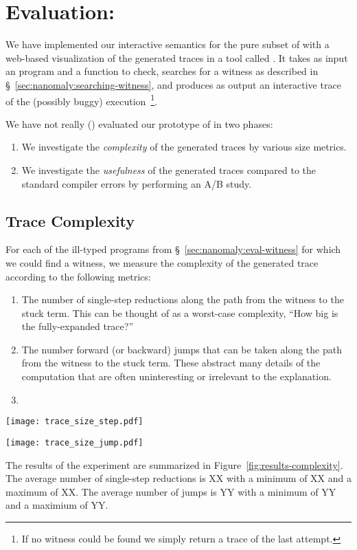 \section{Evaluation: \nanomaly}
\label{sec:nanomaly:evaluation-nanomaly}
We have implemented our interactive semantics for the pure subset of
\ocaml with a web-based visualization of the generated traces in a tool
called \nanomaly.
%
It takes as input an \ocaml program and a function to check, searches
for a witness as described in \S~\ref{sec:nanomaly:searching-witness}, and
produces as output an interactive trace of the (possibly buggy)
execution~\footnote{If no witness could be found we simply return a trace
  of the last attempt.}.

We have not really () evaluated our prototype of \nanomaly in two phases:
%
\begin{enumerate}
\item We investigate the \emph{complexity} of the generated traces by various size metrics.
\item We investigate the \emph{usefulness} of the generated traces compared to the standard compiler errors by performing an A/B study.
\end{enumerate}

\subsection{Trace Complexity}
\label{sec:nanomaly:trace-complexity}
For each of the ill-typed programs from \S~\ref{sec:nanomaly:eval-witness} for
which we could find a witness, we measure the complexity of the
generated trace according to the following metrics:
%
\begin{enumerate}
\item The number of single-step reductions along the path from the
  witness to the stuck term. This can be thought of as a worst-case
  complexity, \ie ``How big is the fully-expanded trace?''
\item The number forward (or backward) jumps that can be taken along the
  path from the witness to the stuck term. These abstract many details
  of the computation that are often uninteresting or irrelevant to the
  explanation.
\item {}
\end{enumerate}
%
\begin{figure*}[t]
\centering
\begin{minipage}{0.49\linewidth}
\texttt{[image: trace\_size\_step.pdf]}
\end{minipage}
\begin{minipage}{0.49\linewidth}
\texttt{[image: trace\_size\_jump.pdf]}
\end{minipage}
\caption{Complexity of the generated traces.}
\label{fig:results-complexity}
\end{figure*}
%
The results of the experiment are summarized in
Figure~\ref{fig:results-complexity}.
%
The average number of single-step reductions is XX with a minimum of XX
and a maximum of XX. The average number of jumps is YY with a minimum of
YY and a maximium of YY.

